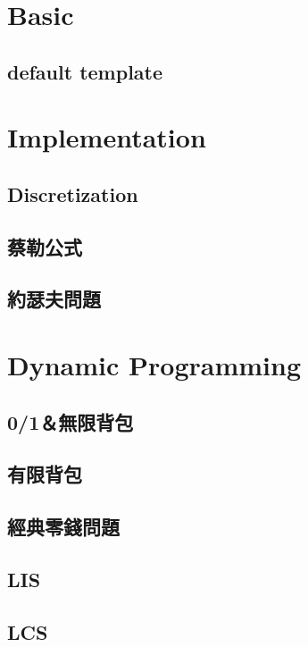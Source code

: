 \section{Basic}
	\subsection{default template}
		
\section{Implementation}
	\subsection{Discretization}
		
	\subsection{蔡勒公式}
		
	\subsection{約瑟夫問題}
		
\section{Dynamic Programming}
	\subsection{0/1＆無限背包}
		
	\subsection{有限背包}
		
	\subsection{經典零錢問題}
		
	\subsection{LIS}
		
	\subsection{LCS}
		
